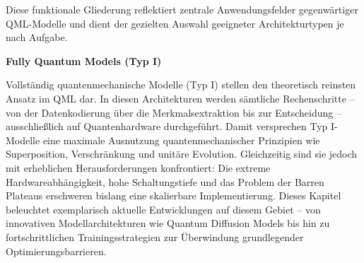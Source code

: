\vspace{1em}
\noindent
Diese funktionale Gliederung reflektiert zentrale Anwendungsfelder gegenwärtiger QML-Modelle und dient der gezielten Auswahl geeigneter Architekturtypen je nach Aufgabe.


\vspace{1.5em}
\noindent\textbf{Fully Quantum Models (Typ I)}

\noindent
Vollständig quantenmechanische Modelle (Typ I) stellen den theoretisch reinsten Ansatz im QML dar. In diesen Architekturen werden sämtliche Rechenschritte – von der Datenkodierung über die Merkmalsextraktion bis zur Entscheidung – ausschließlich auf Quantenhardware durchgeführt. Damit versprechen Typ I-Modelle eine maximale Ausnutzung quantenmechanischer Prinzipien wie Superposition, Verschränkung und unitäre Evolution.
Gleichzeitig sind sie jedoch mit erheblichen Herausforderungen konfrontiert: Die extreme Hardwareabhängigkeit, hohe Schaltungstiefe und das Problem der Barren Plateaus erschweren bislang eine skalierbare Implementierung. Dieses Kapitel beleuchtet exemplarisch aktuelle Entwicklungen auf diesem Gebiet – von innovativen Modellarchitekturen wie Quantum Diffusion Models bis hin zu fortschrittlichen Trainingsstrategien zur Überwindung grundlegender Optimierungsbarrieren.

